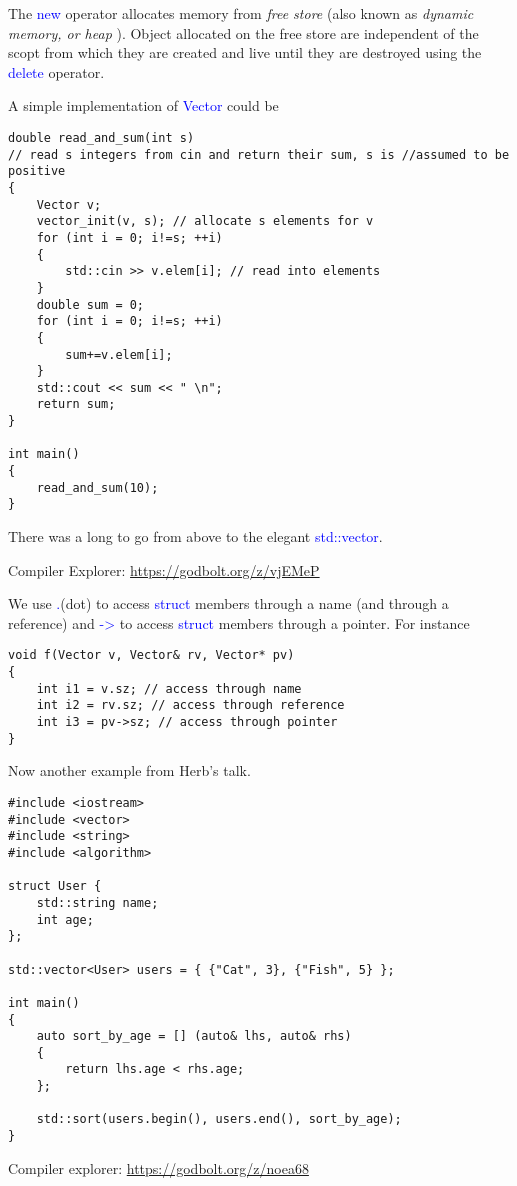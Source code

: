 \documentclass{article}
\newcommand{\blue}[1]{\textcolor{blue}{#1}}
\newcommand{\be}[1]{\textcolor{blue}{#1}}
\begin{document}
The \be{new} operator allocates memory from \emph{free store} (also known as \emph{dynamic memory, or heap} ).
Object allocated on the free store are independent of the scopt from which they are created and live until they are destroyed using the \be{delete} operator.

A simple implementation of \blue{Vector} could be 
\begin{verbatim}
double read_and_sum(int s)
// read s integers from cin and return their sum, s is //assumed to be positive
{
    Vector v;
    vector_init(v, s); // allocate s elements for v
    for (int i = 0; i!=s; ++i)
    {
        std::cin >> v.elem[i]; // read into elements
    }
    double sum = 0;
    for (int i = 0; i!=s; ++i)
    {
        sum+=v.elem[i];
    }
    std::cout << sum << " \n";
    return sum;
}

int main()
{
    read_and_sum(10);
}	
\end{verbatim}
There was a long to go from above to the elegant \blue{std::vector}.

Compiler Explorer: \url{https://godbolt.org/z/vjEMeP}

We use \blue{.}(dot) to access \blue{struct} members through a name (and through a reference) and \blue{->} to access 
\blue{struct} members through a pointer. For instance

\begin{verbatim}
void f(Vector v, Vector& rv, Vector* pv)
{
    int i1 = v.sz; // access through name
    int i2 = rv.sz; // access through reference
    int i3 = pv->sz; // access through pointer
}
\end{verbatim}


Now another example from Herb's talk.
\begin{verbatim}
#include <iostream>
#include <vector>
#include <string>
#include <algorithm>

struct User {
    std::string name;
    int age;
};

std::vector<User> users = { {"Cat", 3}, {"Fish", 5} };

int main()
{
    auto sort_by_age = [] (auto& lhs, auto& rhs)
    {
        return lhs.age < rhs.age;
    };

    std::sort(users.begin(), users.end(), sort_by_age);
}
\end{verbatim}
Compiler explorer: \url{https://godbolt.org/z/noea68}
\end{document}
